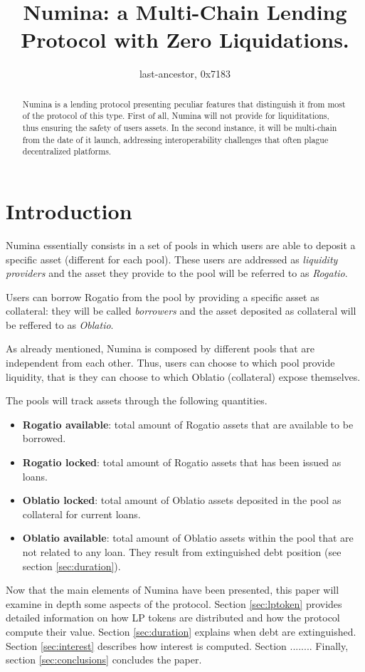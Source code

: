 \documentclass[12pt]{paper}
\title{Numina: a Multi-Chain Lending Protocol with Zero Liquidations.}
\author{last-ancestor, 0x7183}
\date{}
\begin{document}
\maketitle


\begin{abstract}
	Numina is a lending protocol presenting peculiar features that distinguish it from most of the protocol of this type. First of all, Numina will not provide for liquiditations, thus ensuring the safety of users assets. In the second instance, it will be multi-chain from the date of it launch,  addressing interoperability challenges that often plague decentralized platforms.
\end{abstract}
	

\section{Introduction}
\label{sec:introduction}
	Numina essentially consists in a set of pools in which users are able to deposit a specific asset (different for each pool). These users are addressed as \textit{liquidity providers} and the asset they provide to the pool will be referred to as \textit{Rogatio}.
	\par Users can borrow Rogatio from the pool by providing a specific asset as collateral: they will be called \textit{borrowers} and the asset deposited as collateral will be reffered to as \textit{Oblatio}.
	\par As already mentioned, Numina is composed by different pools that are independent from each other. Thus, users can choose to which pool provide liquidity, that is they can choose to which Oblatio (collateral) expose themselves.
	\par The pools will track assets through the following quantities.
	\begin{itemize}
		\item \textbf{Rogatio available}: total amount of Rogatio assets that are available to be borrowed.
		\item \textbf{Rogatio locked}: total amount of Rogatio assets that has been issued as loans.
		\item \textbf{Oblatio locked}: total amount of Oblatio assets deposited in the pool as collateral for current loans.
		\item \textbf{Oblatio available}: total amount of Oblatio assets within the pool that are not related to any loan. They result from extinguished debt position (see section \ref{sec:duration}).
	\end{itemize} 
	Now that the main elements of Numina have been presented, this paper will examine in depth some aspects of the protocol. Section \ref{sec:lptoken} provides detailed information on how LP tokens are distributed and how the protocol compute their value. Section \ref{sec:duration} explains when debt are extinguished. Section \ref{sec:interest} describes how interest is computed. Section ........ Finally, section \ref{sec:conclusions} concludes the paper. 
	
\end{document}
